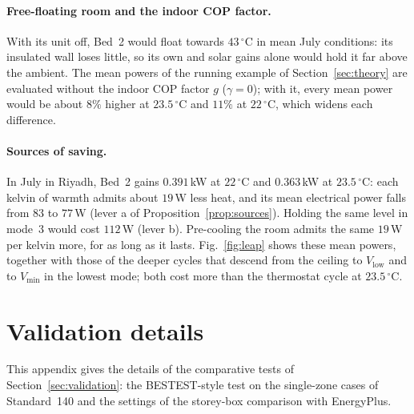 \documentclass[10pt,a4paper,twocolumn]{article}
\theoremstyle{definition}
\newcommand{\exL}{0.363}
\newcommand{\exVfree}{43}
\newcommand{\exWOne}{77}
\newcommand{\exWThree}{112}
\newcommand{\exLcur}{0.391}
\newcommand{\exWcur}{83}
\newcommand{\exWperK}{19}
\begin{document}
\paragraph{Free-floating room and the indoor COP factor.} With its unit off, Bed~2 would float towards $\exVfree\,^{\circ}$C in mean July conditions: its insulated wall loses little, so its own and solar gains alone would hold it far above the ambient. The mean powers of the running example of Section~\ref{sec:theory} are evaluated without the indoor COP factor $g$ ($\gamma=0$); with it, every mean power would be about $8\%$ higher at $23.5\,^{\circ}$C and $11\%$ at $22\,^{\circ}$C, which widens each difference.

\paragraph{Sources of saving.} In July in Riyadh, Bed~2 gains $\exLcur\,$kW at $22\,^{\circ}$C and $\exL\,$kW at $23.5\,^{\circ}$C: each kelvin of warmth admits about $\exWperK\,$W less heat, and its mean electrical power falls from $\exWcur$ to $\exWOne\,$W (lever a of Proposition~\ref{prop:sources}). Holding the same level in mode~3 would cost $\exWThree\,$W (lever b). Pre-cooling the room admits the same $\exWperK\,$W per kelvin more, for as long as it lasts. Fig.~\ref{fig:leap} shows these mean powers, together with those of the deeper cycles that descend from the ceiling to $V_{\text{low}}$ and to $V_{\min}$ in the lowest mode; both cost more than the thermostat cycle at $23.5\,^{\circ}$C.

\section{Validation details}\label{S:validation}\label{app:S5}
This appendix gives the details of the comparative tests of Section~\ref{sec:validation}: the BESTEST-style test on the single-zone cases of Standard~140 and the settings of the storey-box comparison with EnergyPlus.
\end{document}

